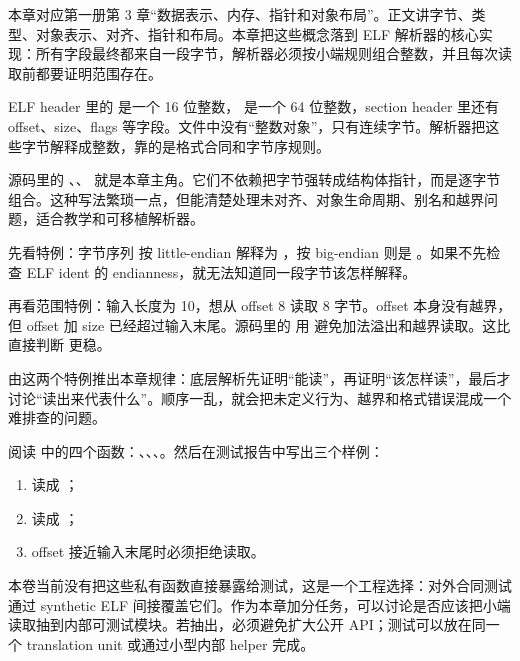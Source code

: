 
本章对应第一册第 3 章“数据表示、内存、指针和对象布局”。正文讲字节、类型、对象表示、对齐、指针和布局。本章把这些概念落到 ELF 解析器的核心实现：所有字段最终都来自一段字节，解析器必须按小端规则组合整数，并且每次读取前都要证明范围存在。


ELF header 里的  是一个 16 位整数， 是一个 64 位整数，section header 里还有 offset、size、flags 等字段。文件中没有“整数对象”，只有连续字节。解析器把这些字节解释成整数，靠的是格式合同和字节序规则。

源码里的 、、 就是本章主角。它们不依赖把字节强转成结构体指针，而是逐字节组合。这种写法繁琐一点，但能清楚处理未对齐、对象生命周期、别名和越界问题，适合教学和可移植解析器。


先看特例：字节序列  按 little-endian 解释为 ，按 big-endian 则是 。如果不先检查 ELF ident 的 endianness，就无法知道同一段字节该怎样解释。

再看范围特例：输入长度为 10，想从 offset 8 读取 8 字节。offset 本身没有越界，但 offset 加 size 已经超过输入末尾。源码里的  用  避免加法溢出和越界读取。这比直接判断  更稳。

由这两个特例推出本章规律：底层解析先证明“能读”，再证明“该怎样读”，最后才讨论“读出来代表什么”。顺序一乱，就会把未定义行为、越界和格式错误混成一个难排查的问题。


阅读  中的四个函数：、、、。然后在测试报告中写出三个样例：

\begin{enumerate}
  \item {} 读成 ；
  \item {} 读成 ；
  \item offset 接近输入末尾时必须拒绝读取。
\end{enumerate}

本卷当前没有把这些私有函数直接暴露给测试，这是一个工程选择：对外合同测试通过 synthetic ELF 间接覆盖它们。作为本章加分任务，可以讨论是否应该把小端读取抽到内部可测试模块。若抽出，必须避免扩大公开 API；测试可以放在同一个 translation unit 或通过小型内部 helper 完成。

